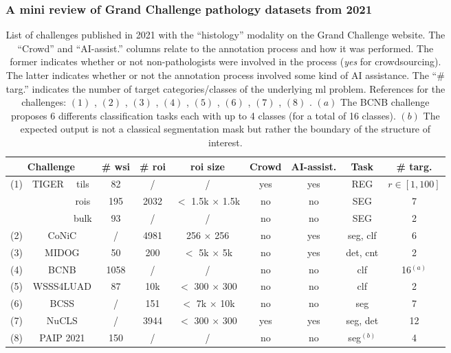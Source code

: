 \subsubsection{A mini review of Grand Challenge pathology datasets from 2021}
\label{sssec:backdp:grandchallenge}

\begin{table}
  \centering
  \footnotesize
  \begin{tabular}{|ccc|ccccccc|}
    \hline
    \multicolumn{3}{|c|}{Challenge} & \# \acrshort{wsi} & \# \acrshort{roi} & \acrshort{roi} size & Crowd & AI-assist. & Task & \# targ. \\
    \hline
    \multirow{3}{*}{(1)} & \multirow{3}{*}{TIGER} & tils & 82 & / &  / & yes & yes & REG & $r \in \left[1, 100\right]$\\
    & & rois & 195 & 2032 & $<$ 1.5k $\times$ 1.5k & no & no & SEG & 7\\
    & & bulk & 93 & / & / & no & no & SEG & 2 \\
    \hdashline
    (2) & \multicolumn{2}{c|}{CoNiC} & / & 4981 & 256 $\times$ 256 & no & yes & \acrshort{seg}, \acrshort{clf} & 6 \\
    (3) & \multicolumn{2}{c|}{MIDOG} 2021 & 50 & 200 & $<$ 5k $\times$ 5k & no & yes & \acrshort{det}, \acrshort{cnt} & 2 \\
    (4) & \multicolumn{2}{c|}{BCNB} & 1058 & / & / & no & no & \acrshort{clf} & 16$^{(a)}$ \\
    (5) & \multicolumn{2}{c|}{WSSS4LUAD} & 87 & 10k & $<$ 300 $\times$ 300 & no & no & \acrshort{clf} & 2\\
    (6) & \multicolumn{2}{c|}{BCSS} & / & 151 & $<$ 7k $\times$ 10k & no & no & \acrshort{seg} & 7\\
    (7) & \multicolumn{2}{c|}{NuCLS} & / & 3944 & $<$ 300 $\times$ 300 & yes & yes & \acrshort{seg}, \acrshort{det} & 12 \\
    (8) & \multicolumn{2}{c|}{PAIP 2021} & 150 & / & / & no & no & \acrshort{seg}$^{(b)}$ & 4 \\
    \hline
  \end{tabular}
  \caption{List of challenges published in 2021 with the ``histology'' modality on the Grand Challenge website. The ``Crowd'' and 
  ``AI-assist.'' columns relate to the annotation process and how it was performed. The former indicates whether or not non-pathologists 
  were involved in the process (\ie \textit{yes} for crowdsourcing). The latter indicates whether or not the annotation process involved 
  some kind of AI assistance. The ``\# targ.'' indicates the number of target categories/classes of the underlying \acrlong{ml} problem. 
  References for the challenges: $(1)$ \TODO{\cite{}}, $(2)$ \cite{graham2021conic}, $(3)$ \cite{aubreville2021mitosis}, $(4)$ \cite{xu2021predicting}, 
  $(5)$ \cite{han2021multilayer}, $(6)$ \cite{amgad2019structured}, $(7)$ \cite{amgad2021nucls}, $(8)$ \TODO{\cite{}}. $(a)$ The BCNB challenge 
  proposes 6 differents classification tasks each with up to 4 classes (for a total of 16 classes). $(b)$ The expected output is not a 
  classical segmentation mask but rather the boundary of the structure of interest.}
  \label{tab:backdp:datascarcity-grandchallenge}
\end{table}

